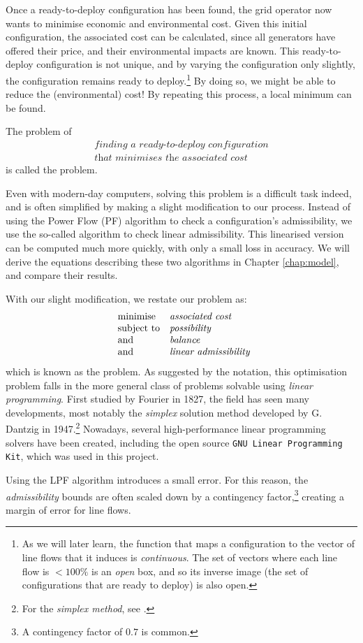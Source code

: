 \documentclass[main.tex]{subfiles}
\begin{document}
Once a {ready-to-deploy} configuration has been found, the grid operator now wants to minimise economic and environmental cost. Given this initial configuration, the associated cost can be calculated, since all generators have offered their price, and their environmental impacts are known. 
This {ready-to-deploy} configuration is not unique, and by varying the configuration only slightly, the configuration remains ready to deploy.\footnote{As we will later learn, the function that maps a configuration to the vector of line flows that it induces is \emph{continuous}. The set of vectors where each line flow is $<100\si{\percent}$ is an \emph{open} box, and so its inverse image (the set of configurations that are ready to deploy) is also open.}
By doing so, we might be able to reduce the (environmental) cost! By repeating this process, a local minimum can be found. 

The problem of
\begin{gather*}
    \textit{finding a ready-to-deploy configuration} \\
    \textit{that minimises the associated cost} \nonumber
\end{gather*}
is called the  problem. 

Even with modern-day computers, solving this problem is a difficult task indeed, and is often simplified by making a slight modification to our process. Instead of using the Power Flow (PF) algorithm to check a configuration's admissibility, we use the so-called  algorithm to check linear admissibility. This linearised version can be computed much more quickly, with only a small loss in accuracy. We will derive the equations describing these two algorithms in Chapter \ref{chap:model}, and compare their results.

With our slight modification, we restate our problem as:
\begin{equation*}
    \begin{array}{ll@{}}
\text{minimise}  & \textit{associated cost} \\
\text{subject to}& \textit{possibility} \\
\text{and}& \textit{balance} \\
\text{and}& \textit{linear admissibility}
\end{array}
\end{equation*}
which is known as the  problem. As suggested by the notation, this optimisation problem falls in the more general class of problems solvable using \emph{linear programming}. First studied by  Fourier in 1827, the field has seen many developments, most notably the \emph{simplex} solution method developed by G. Dantzig in 1947.\footnote{For the \emph{simplex method}, see \cite{Matousek2007} .}
Nowadays, several high-performance linear programming solvers have been created, including the open source \texttt{GNU Linear Programming Kit}, which was used in this project.

Using the LPF algorithm introduces a small error. For this reason, the \emph{admissibility} bounds are often scaled down by a contingency factor,\footnote{A contingency factor of $0.7$ is common.} creating a margin of error for line flows.
\end{document}
